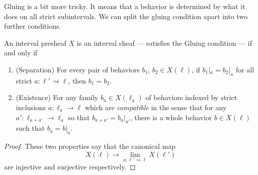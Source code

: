 \documentclass[DynamicalBook]{subfiles}
\begin{document}
Gluing is a bit more tricky. It means that a behavior is determined by what it does on all strict subintervals. We can split the gluing condition apart into two further conditions.
\begin{lemma}\label{lem:gluing.condition.two.conditions}
  An interval presheaf $X$ is an interval sheaf --- satisfies the Gluing condition --- if and only if
  \begin{enumerate}
          \item (Separation) For every pair of behaviors $b_{1},\, b_{2} \in X(\ell)$, if $b_{1}|_{a} = b_{2}|_{a}$ for all strict $a : \ell' \rightsquigarrow \ell$, then $b_{1} = b_{2}$.
    \item (Existence) For any family $b_{a} \in X(\ell_{a})$ of behaviors indexed by strict inclusions $a : \ell_{a} \to \ell$ which are \emph{compatible} in the sense that for any $a' : \ell_{a + a'} \to \ell_{a}$ so that $b_{a + a'} = b_{a}|_{a'} $, there is a whole behavior $b \in X(\ell)$ such that $b_{a} = b|_{a}$.
  \end{enumerate}
  \end{lemma}
  \begin{proof}
    These two properties say that the canonical map
    $$X(\ell) \to \lim_{a : \ell' \rightsquigarrow \ell} X(\ell')$$
    are injective and surjective respectively.
  \end{proof}
\end{document}
